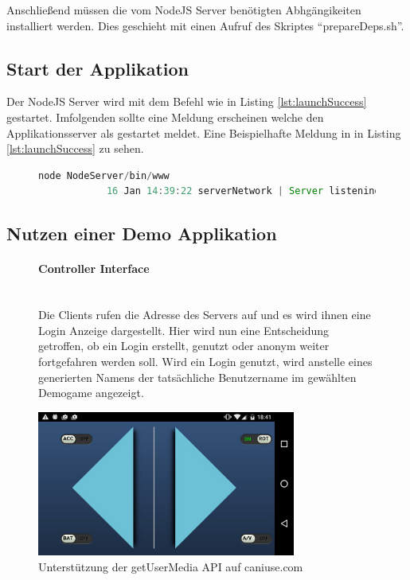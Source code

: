\documentclass[a4paper]{spie}  %
\begin{document}
Anschließend müssen die vom NodeJS Server benötigten Abhgängikeiten installiert werden. Dies geschieht mit einen Aufruf des Skriptes \enquote{prepareDeps.sh}.
\lstset{
  numbers=left,
  stepnumber=5,
  firstnumber=1,
  numberfirstline=true
}

\subsection{Start der Applikation}
Der NodeJS Server wird mit dem Befehl wie in Listing \ref{lst:launchSuccess} gestartet. Imfolgenden sollte eine Meldung erscheinen welche den Applikationsserver als gestartet meldet. Eine Beispielhafte Meldung in in Listing \ref{lst:launchSuccess} zu sehen.

\begin{figure}[h!]
	\centering
        \begin{lstlisting}[language=JavaScript,caption={Start der Applikation},label={lst:launchSuccess}]
            node NodeServer/bin/www
            16 Jan 14:39:22 serverNetwork | Server listening on port 5222
        \end{lstlisting}
\end{figure}
\subsection{Nutzen einer Demo Applikation}

\begin{figure}[H]
\begin{minipage}[t]{0.4\textwidth}
\vspace{0pt}
\paragraph{Controller Interface}\mbox{}\\
Die Clients rufen die Adresse des Servers auf und es wird ihnen eine Login Anzeige dargestellt. Hier wird nun eine Entscheidung getroffen, ob ein Login erstellt, genutzt oder anonym weiter fortgefahren werden soll.
Wird ein Login genutzt, wird anstelle eines generierten Namens der tatsächliche Benutzername im gewählten Demogame angezeigt.

\end{minipage}
\hfill
\begin{minipage}[t]{0.5\textwidth}
\vspace{0pt}
    \includegraphics[width=8.5cm]{images/controllerLayoutModern}
     \caption{Unterstützung der getUserMedia API auf caniuse.com}
		\label{fig:test2}
\end{minipage}
\end{figure}
\end{document}
